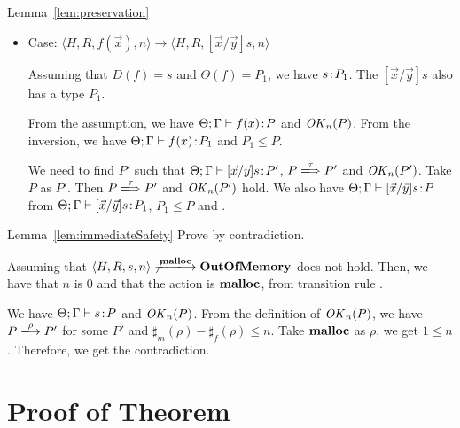 \begin{pfof}{Lemma~\ref{lem:preservation}}
\begin{itemize}
\item Case: $\langle H, R, f(\vec{x}) , n \rangle \rightarrow  \langle H, R, [\vec{x}/\vec{y}]s, n  \rangle $

  Assuming that \(D(f) = s\) and \(\Theta(f) = P_1\), we have \(s\!:\!
  P_1\). The \([\vec{x}/\vec{y}]s\) also has a type \(P_1\).

  From the assumption, we have \(\Theta;\Gamma \vdash f(x)\!:\! P\) and
  \(\mathit{OK}_n(P)\). From the inversion, we have \(\Theta;\Gamma \vdash
  f(x)\!:\! P_1\) and \(P_1 \le P\).

  We need to find \(P'\) such that \(\Theta;\Gamma \vdash [\vec{x}/\vec{y}]s\!:\!
  P'\), \(P \xLongrightarrow{\tau} P'\) and \(\mathit{OK}_n(P')\). Take \(P\) as
  \(P'\). Then \(P \xLongrightarrow{\tau} P'\) and \(\mathit{OK}_n(P')\) hold. We
  also have \(\Theta;\Gamma \vdash [\vec{x}/\vec{y}]s\!:\! P \) from
  \(\Theta;\Gamma \vdash [\vec{x}/\vec{y}]s\!:\! P_1\), \(P_1 \le P\) and
  .

\end{itemize}

\end{pfof}


\begin{pfof}{Lemma~\ref{lem:immediateSafety}}
Prove by contradiction.

Assuming that \(\langle H, R, s, n \rangle
\not\xlongrightarrow{\Malloc} \OVERFLOW \) does not hold. Then, we
have that \(n\) is \(0\) and that the action is \(\mathbf{malloc}\), from transition rule
.

We have \(\Theta;\Gamma \vdash s \!:\! P\) and \(\mathit{OK}_n(P)\). From the
definition of \(\mathit{OK}_n(P)\), we have \(P \xlongrightarrow{\rho} P'\)
for some \(P'\) and \(\sharp_m(\rho) - \sharp_f(\rho) \le n \). Take
\(\mathbf{malloc}\) as \(\rho\), we get \( 1 \le n \). Therefore, we get the
contradiction.

\end{pfof}


\section{Proof of Theorem}

